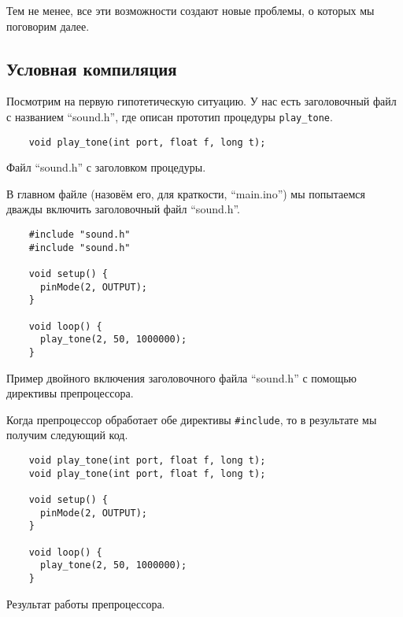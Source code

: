 \documentclass[../sparc.tex]{subfiles}
\begin{document}
Тем не менее, все эти возможности создают новые проблемы, о которых мы поговорим
далее.

\subsection{Условная компиляция}
\label{subsection:conditional-compiling}

Посмотрим на первую гипотетическую ситуацию.  У нас есть заголовочный файл с
названием ``sound.h'', где описан прототип процедуры
\texttt{play_tone}.

\begin{listing}[H]
  \begin{verbatim}
    void play_tone(int port, float f, long t);
  \end{verbatim}
  \label{listing:game-dev-engine-procedure-header-2}
  \caption{Файл ``sound.h'' с заголовком процедуры.}
\end{listing}

В главном файле (назовём его, для краткости, ``main.ino'') мы попытаемся дважды
включить заголовочный файл ``sound.h''.

\begin{listing}[H]
  \begin{verbatim}
    #include "sound.h"
    #include "sound.h"

    void setup() {
      pinMode(2, OUTPUT);
    }

    void loop() {
      play_tone(2, 50, 1000000);
    }
  \end{verbatim}
  \label{listing:game-dev-engine-procedure-header-include-2}
  \caption{Пример двойного включения заголовочного файла ``sound.h'' с помощью
    директивы препроцессора.}
\end{listing}

Когда препроцессор обработает обе директивы \texttt{#include}, то в
результате мы получим следующий код.

\begin{listing}[H]
  \begin{verbatim}
    void play_tone(int port, float f, long t);
    void play_tone(int port, float f, long t);

    void setup() {
      pinMode(2, OUTPUT);
    }

    void loop() {
      play_tone(2, 50, 1000000);
    }
  \end{verbatim}
  \label{listing:game-dev-engine-procedure-header-include-2}
  \caption{Результат работы препроцессора.}
\end{listing}
\end{document}
